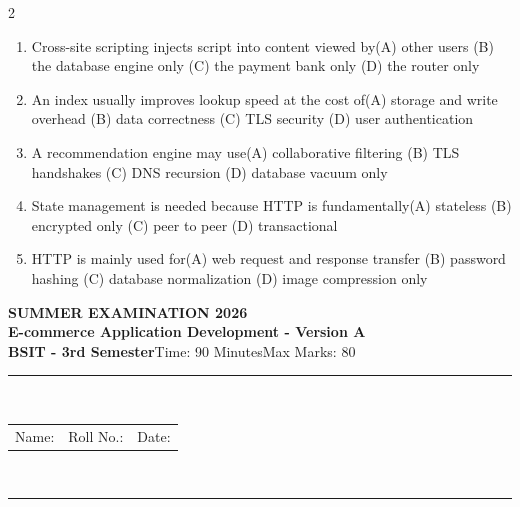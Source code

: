 \documentclass[a4paper]{article}
\makeatletter
\newcommand{\examheader}{%
\begin{center}\textbf{\large SUMMER EXAMINATION 2026}\\[-1pt]
\textbf{\normalsize E-commerce Application Development - Version A}\\[-1pt]
\textbf{BSIT - 3rd Semester}\quad Time: 90 Minutes\quad Max Marks: 80\\[-1pt]
\textcolor{black!65}{\rule{\linewidth}{0.45pt}}\\[-2pt]
\begin{tabularx}{\linewidth}{@{}X X X@{}}Name: \hrulefill & Roll No.: \hrulefill & Date: \hrulefill\end{tabularx}\\[-1pt]
\textcolor{black!65}{\rule{\linewidth}{0.45pt}}\end{center}}
\makeatother
\begin{document}
\begin{multicols*}{2}
\begin{enumerate}
\item Cross-site scripting injects script into content viewed by\newline\hspace*{0.6em}(A) other users \quad (B) the database engine only \newline\hspace*{0.6em}(C) the payment bank only \quad (D) the router only
\item An index usually improves lookup speed at the cost of\newline\hspace*{0.6em}(A) storage and write overhead \quad (B) data correctness \newline\hspace*{0.6em}(C) TLS security \quad (D) user authentication
\item A recommendation engine may use\newline\hspace*{0.6em}(A) collaborative filtering \quad (B) TLS handshakes \newline\hspace*{0.6em}(C) DNS recursion \quad (D) database vacuum only
\item State management is needed because HTTP is fundamentally\newline\hspace*{0.6em}(A) stateless \quad (B) encrypted only \newline\hspace*{0.6em}(C) peer to peer \quad (D) transactional
\item HTTP is mainly used for\newline\hspace*{0.6em}(A) web request and response transfer \quad (B) password hashing \newline\hspace*{0.6em}(C) database normalization \quad (D) image compression only
\end{enumerate}
\end{multicols*}
\newpage
\examheader
\raggedcolumns
\end{document}
